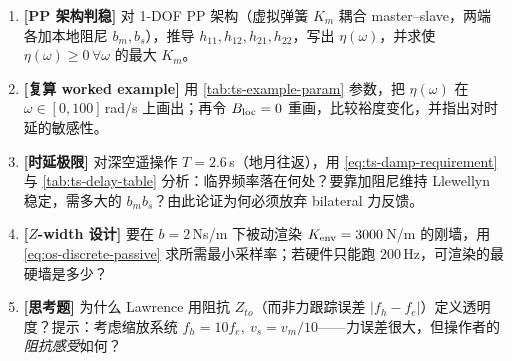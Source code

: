 \begin{practice}[本章练习]
\begin{enumerate}
  \item \textbf{[PP 架构判稳]} 对 1-DOF PP 架构（虚拟弹簧 $K_m$ 耦合 master--slave，两端各加本地阻尼 $b_m,b_s$），推导 $h_{11},h_{12},h_{21},h_{22}$，写出 $\eta(\omega)$，并求使 $\eta(\omega)\ge0\,\forall\omega$ 的最大 $K_m$。
  \item \textbf{[复算 worked example]} 用 \cref{tab:ts-example-param} 参数，把 $\eta(\omega)$ 在 $\omega\in[0,100]\,$rad/s 上画出；再令 $B_{\rm loc}=0$ 重画，比较裕度变化，并指出对时延的敏感性。
  \item \textbf{[时延极限]} 对深空遥操作 $T=2.6\,$s（地月往返），用 \cref{eq:ts-damp-requirement} 与 \cref{tab:ts-delay-table} 分析：临界频率落在何处？要靠加阻尼维持 Llewellyn 稳定，需多大的 $b_mb_s$？由此论证为何必须放弃 bilateral 力反馈。
  \item \textbf{[$Z$-width 设计]} 要在 $b=2\,$Ns/m 下被动渲染 $K_{\rm env}=3000\,$N/m 的刚墙，用 \cref{eq:os-discrete-passive} 求所需最小采样率；若硬件只能跑 $200\,$Hz，可渲染的最硬墙是多少？
  \item \textbf{[思考题]} 为什么 Lawrence 用阻抗 $Z_{to}$（而非力跟踪误差 $|f_h-f_e|$）定义透明度？提示：考虑缩放系统 $f_h=10f_e,\ v_s=v_m/10$——力误差很大，但操作者的\emph{阻抗感受}如何？
\end{enumerate}
\end{practice}
